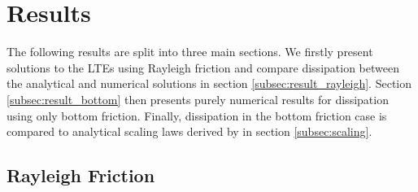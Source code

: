 \section{Results \label{sec:results}}

The following results are split into three main sections. We firstly present solutions to the LTEs using Rayleigh friction and compare dissipation between the analytical and numerical solutions in section \ref{subsec:result_rayleigh}. Section \ref{subsec:result_bottom} then presents purely numerical results for dissipation using only bottom friction. Finally, dissipation in the bottom friction case is compared to analytical scaling laws derived by \citet{chen2013tidal} in section \ref{subsec:scaling}.

\subsection{Rayleigh Friction \label{subsec:result_rayleigh}}
